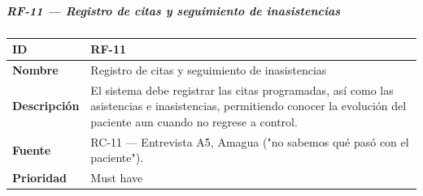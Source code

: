 \subparagraph{RF-11 --- Registro de citas y seguimiento de
inasistencias}\label{rf-11-registro-de-citas-y-seguimiento-de-inasistencias}

{\def\LTcaptype{none} %
\begin{longtable}[]{@{}
  >{\raggedright\arraybackslash}p{}
  >{\raggedright\arraybackslash}p{}@{}}
\toprule\noalign{}
\begin{minipage}[b]{\linewidth}\raggedright
\textbf{ID}
\end{minipage} & \begin{minipage}[b]{\linewidth}\raggedright
RF-11
\end{minipage} \\
\midrule\noalign{}
\endhead
\bottomrule\noalign{}
\endlastfoot
\textbf{Nombre} & \begin{minipage}[t]{\linewidth}\raggedright
Registro de citas y seguimiento de inasistencias
\end{minipage} \\
\textbf{Descripción} & \begin{minipage}[t]{\linewidth}\raggedright
El sistema debe registrar las citas programadas, así como las
asistencias e inasistencias, permitiendo conocer la evolución del
paciente aun cuando no regrese a control.
\end{minipage} \\
\textbf{Fuente} & \begin{minipage}[t]{\linewidth}\raggedright
RC-11 --- Entrevista A5, Amagua ("no sabemos qué pasó con el paciente").
\end{minipage} \\
\textbf{Prioridad} & \begin{minipage}[t]{\linewidth}\raggedright
Must have
\end{minipage} \\
\end{longtable}
}

